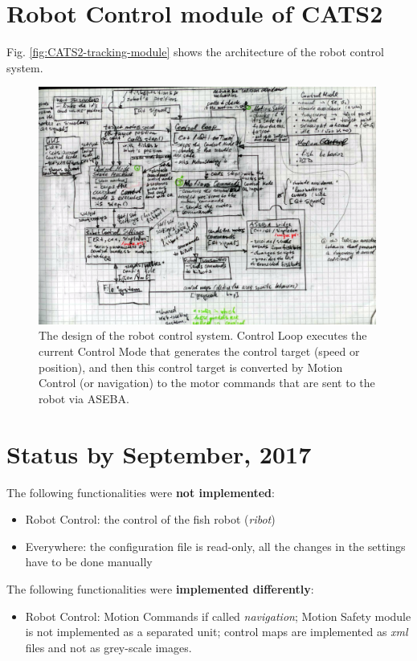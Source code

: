 \documentclass{styles/assisi}
\begin{document}
\section {Robot Control module of CATS2}
Fig. \ref{fig:CATS2-tracking-module} shows the architecture of the robot control system.

\begin{figure}[h]
\centering
\includegraphics[width=0.99\textwidth]{./outline/robot-control-edit}
\caption{The design of the robot control system. Control Loop executes the current Control Mode that generates the control target (speed or position), and then this control target is converted by Motion Control (or navigation) to the motor commands that are sent to the robot via ASEBA.}
\label{fig:CATS2-robot-control-module}
\end{figure}

\section {Status by September, 2017}
The following functionalities were {\bf not implemented}:
\begin{itemize}
\item Robot Control: the control of the fish robot ({\it ribot})
\item Everywhere: the configuration file is read-only, all the changes in the settings have to be done manually
\end{itemize}

The following functionalities were {\bf implemented differently}:
\begin{itemize}
\item Robot Control: Motion Commands if called {\it navigation}; Motion Safety module is not implemented as a separated unit; control maps are implemented as {\it xml} files and not as grey-scale images. 
\end{itemize}
\end{document}
